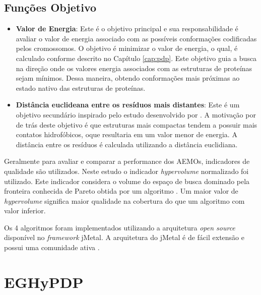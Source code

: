 \subsection{Funções Objetivo}


\begin{itemize}
	\item \textbf{Valor de Energia}: Este é o objetivo principal e sua responsabilidade é avaliar o valor de energia associado com as possíveis conformações codificadas pelos cromossomos. O objetivo é minimizar o valor de energia, o qual, é calculado conforme descrito no Capítulo \ref{cap:pdp}. Este objetivo guia a busca na direção onde os valores energia associados com as estruturas de proteínas sejam mínimos. Dessa maneira, obtendo conformações mais próximas ao estado nativo das estruturas de proteínas.

    \item \textbf{Distância euclideana entre os resíduos mais distantes}: Este é um objetivo secundário inspirado pelo estudo desenvolvido por \cite{gabriel2012algoritmos}. A motivação por de trás deste objetivo é que estruturas mais compactas tendem a possuir mais contatos hidrofóbicos, oque resultaria em um valor menor de energia. A distância entre os resíduos é calculada utilizando a distância euclidiana.
   
\end{itemize}

Geralmente para avaliar e comparar a performance dos AEMOs, indicadores de qualidade são utilizados. Neste estudo o indicador \textit{hypervolume} normalizado foi utilizado. Este indicador considera o volume do espaço de busca dominado pela fronteira conhecida de Pareto obtida por um algoritmo \cite{zitzler2003performance}. Um maior valor de \textit{hypervolume} significa maior qualidade na cobertura do que um algoritmo com valor inferior.

Os 4 algoritmos foram implementados utilizando a arquitetura \textit{open source} disponível no \textit{framework} jMetal. A arquitetura do jMetal é de fácil extensão e possui uma comunidade ativa	.


\section{EGHyPDP}
\label{sec:eghypdp}

